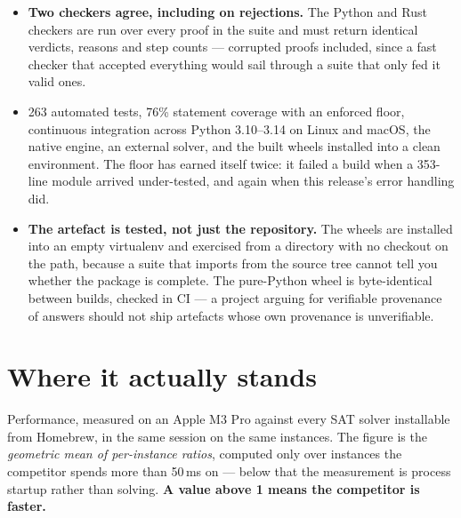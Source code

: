 \documentclass[11pt,a4paper]{article}
\begin{document}
\begin{itemize}
        The corpus was 164 until the two families that decide the outcome were
        raised to the 100 instances each SATLIB ships --- at the smaller size
        only 14 instances ran long enough to time, and one of them decided the
        ranking.
  \item \textbf{Two checkers agree, including on rejections.} The Python and
        Rust checkers are run over every proof in the suite and must return
        identical verdicts, reasons and step counts --- corrupted proofs
        included, since a fast checker that accepted everything would sail
        through a suite that only fed it valid ones.
  \item 263 automated tests, 76\% statement coverage with an enforced floor,
        continuous integration across Python 3.10--3.14 on Linux and macOS,
        the native engine, an external solver, and the built wheels installed
        into a clean environment. The floor has earned itself twice: it failed
        a build when a 353-line module arrived under-tested, and again when
        this release's error handling did.
  \item \textbf{The artefact is tested, not just the repository.} The wheels
        are installed into an empty virtualenv and exercised from a directory
        with no checkout on the path, because a suite that imports from the
        source tree cannot tell you whether the package is complete. The
        pure-Python wheel is byte-identical between builds, checked in CI ---
        a project arguing for verifiable provenance of answers should not ship
        artefacts whose own provenance is unverifiable.
\end{itemize}

\section{Where it actually stands}
\label{sec:stands}

Performance, measured on an Apple M3 Pro against every SAT solver installable
from Homebrew, in the same session on the same instances. The figure is the
\emph{geometric mean of per-instance ratios}, computed only over instances the
competitor spends more than 50\,ms on --- below that the measurement is process
startup rather than solving. \textbf{A value above 1 means the competitor is
faster.}
\end{document}
